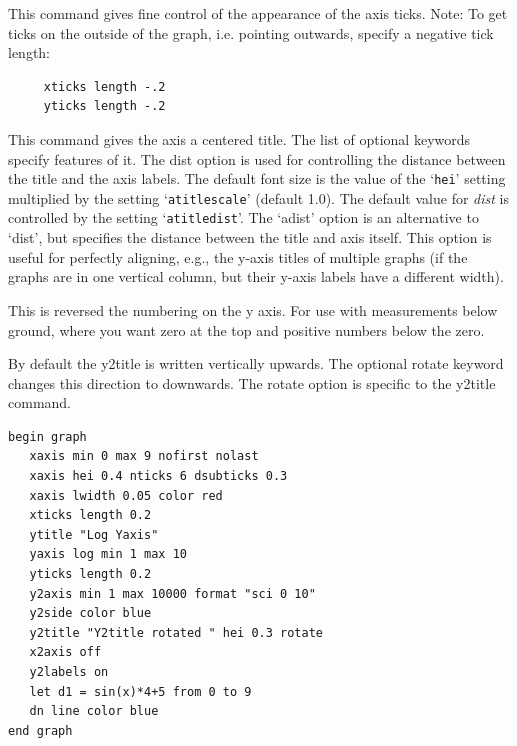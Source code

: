 \begin{commanddescription}
\item[{\sf xticks {\it {\sf lstyle} num {\sf lwidth} exp {\sf length} exp {\sf off}}} ]
This command gives fine control of the appearance of the axis ticks.
Note: To get ticks on the outside of the graph, i.e. pointing outwards,
specify a negative tick length:

\preglecode{}
\begin{Verbatim}
     xticks length -.2
     yticks length -.2
\end{Verbatim}
\postglecode{}

\item[{\sf xtitle {\it "title"}  [hei {\it ch-hei}]  [color {\it col}] [font {\it font}] [dist {\it cm}] [adist {\it cm}]}]
This command gives the axis a centered title.  The list of optional keywords specify features of it.  The {\sf dist} option is used for controlling the distance between the title and the axis labels. The default font size is the value of the `\texttt{hei}' setting multiplied by the setting `\texttt{atitlescale}' (default 1.0). The default value for {\it dist} is controlled by the setting `\texttt{atitledist}'. The `{\sf adist}' option is an alternative to `{\sf dist}', but specifies the distance between the title and axis itself. This option is useful for perfectly aligning, e.g., the y-axis titles of multiple graphs (if the graphs are in one vertical column, but their y-axis labels have a different width).

\item[{\sf xaxis negate}  ]
This is reversed the numbering on the y axis.  For use with
measurements below ground, where you want zero at the top and
positive numbers below the zero.

\item[{\sf y2title {\it "text-string"}  [rotate]  }  ]
By default the y2title is written vertically upwards.  The optional
{\sf rotate} keyword changes this direction to downwards.  The {\sf rotate} option
is specific to the {\sf y2title} command.

\begin{minipage}[c]{8cm}
\begin{Verbatim}
begin graph
   xaxis min 0 max 9 nofirst nolast
   xaxis hei 0.4 nticks 6 dsubticks 0.3
   xaxis lwidth 0.05 color red
   xticks length 0.2
   ytitle "Log Yaxis"
   yaxis log min 1 max 10
   yticks length 0.2
   y2axis min 1 max 10000 format "sci 0 10"
   y2side color blue
   y2title "Y2title rotated " hei 0.3 rotate
   x2axis off
   y2labels on
   let d1 = sin(x)*4+5 from 0 to 9
   dn line color blue
end graph
\end{Verbatim}
\end{minipage}
\hfill
\begin{minipage}[c]{7cm}
\mbox{}
\end{minipage}


\end{commanddescription}
